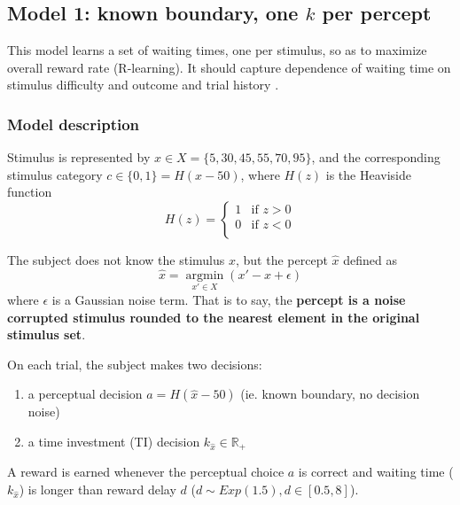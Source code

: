 \subsection{Model 1: known boundary, one $k$ per percept}

This model learns a set of waiting times, one per stimulus, so as to maximize overall reward rate (R-learning).
It should capture dependence of waiting time on stimulus difficulty and outcome \citep[Fig 3G]{lak2014orbitofrontal} and trial history \citep[Fig S3]{lak2014orbitofrontal}.

\subsubsection{Model description}

Stimulus is represented by $x \in X = \{5, 30, 45, 55, 70, 95 \}$, and the corresponding stimulus category $c \in \{0,1\} = H(x-50)$, where $H(z)$ is the Heaviside function
\begin{equation}
H(z) =
\begin{cases}
1 & \text{if }  z > 0 \\
0 & \text{if }  z < 0 \\
\end{cases}
\label{eq:heavi}
\nonumber
\end{equation}

The subject does not know the stimulus $x$, but the percept $\hat{x}$ defined as
\begin{equation}
    \hat{x} = \underset{x' \in X}{\operatorname{argmin}} \left( x' - x + \epsilon \right)
    \nonumber
\end{equation}
where $\epsilon$ is a Gaussian noise term.
That is to say, the\textbf{ percept is a noise corrupted stimulus rounded to the nearest element in the original stimulus set}.

On each trial, the subject makes two decisions:
\begin{enumerate}
    \item a perceptual decision $a = H(\hat{x} - 50)$ (ie. known boundary, no decision noise)
    \item a time investment (TI) decision $ k_{\hat{x}} \in \mathbb{R}_+ $
\end{enumerate}

A reward is earned whenever the perceptual choice $a$ is correct and waiting time ($k_{\hat{x}}$) is longer than reward delay $d$ ($d \sim Exp(1.5), d \in \left[0.5,8\right]$).


